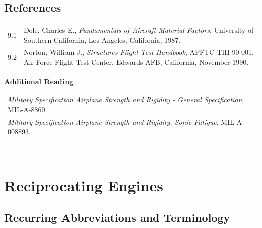 \documentclass[
]{book}
\begin{document}
\hypertarget{references}{%
\section{References}\label{references}}

\begin{longtable}[]{@{}ll@{}}
\toprule
\endhead
\begin{minipage}[t]{0.06\columnwidth}\raggedright
9.1\strut
\end{minipage} & \begin{minipage}[t]{0.88\columnwidth}\raggedright
Dole, Charles E., \emph{Fundamentals of Aircraft Material Factors}, University of Southern California, Los Angeles, California, 1987.\strut
\end{minipage}\tabularnewline
\begin{minipage}[t]{0.06\columnwidth}\raggedright
9.2\strut
\end{minipage} & \begin{minipage}[t]{0.88\columnwidth}\raggedright
Norton, William J., \emph{Structures Flight Test Handbook}, AFFTC-TIH-90-001, Air Force Flight Test Center, Edwards AFB, California, November 1990.\strut
\end{minipage}\tabularnewline
\bottomrule
\end{longtable}

\textbf{Additional Reading}

\begin{longtable}[]{@{}l@{}}
\toprule
\endhead
\begin{minipage}[t]{0.97\columnwidth}\raggedright
\emph{Military Specification Airplane Strength and Rigidity - General Specification}, MIL-A-8860.\strut
\end{minipage}\tabularnewline
\begin{minipage}[t]{0.97\columnwidth}\raggedright
\emph{Military Specification Airplane Strength and Rigidity, Sonic Fatigue}, MIL-A-008893.\strut
\end{minipage}\tabularnewline
\bottomrule
\end{longtable}

~

\hypertarget{reciprocating-engines}{%
\chapter{Reciprocating Engines}\label{reciprocating-engines}}

\hypertarget{recurring-abbreviations-and-terminology}{%
\section{Recurring Abbreviations and Terminology}\label{recurring-abbreviations-and-terminology}}
\end{document}
